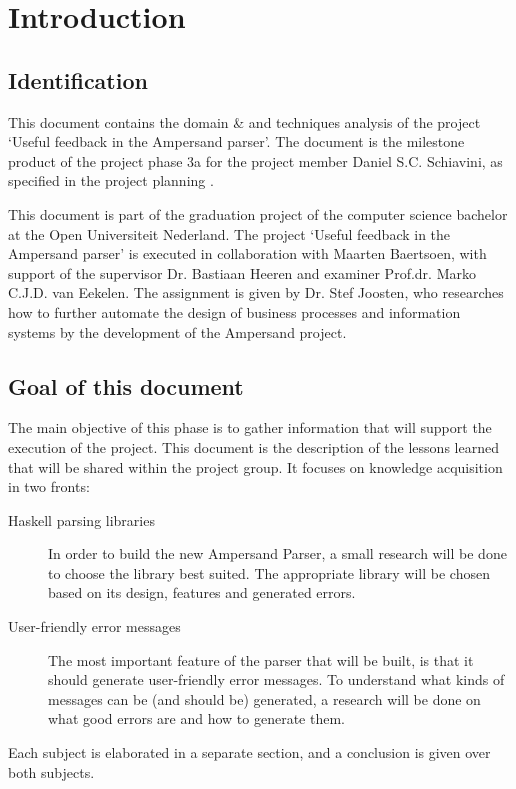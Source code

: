 \section{Introduction}
\subsection{Identification}
This document contains the domain \& and techniques analysis of the project `Useful feedback in the Ampersand parser'.
The document is the milestone product of the project phase 3a for the project member Daniel S.C. Schiavini, as specified in the project planning \cite{plan}.

This document is part of the graduation project of the computer science bachelor at the Open Universiteit Nederland.
The project `Useful feedback in the Ampersand parser' is executed in collaboration with Maarten Baertsoen, with support of the supervisor Dr. Bastiaan Heeren and examiner Prof.dr. Marko C.J.D. van Eekelen.
The assignment is given by Dr. Stef Joosten, who researches how to further automate the design of business processes and information systems by the development of the Ampersand project.

\subsection{Goal of this document}
The main objective of this phase is to gather information that will support the execution of the project.
This document is the description of the lessons learned that will be shared within the project group.
It focuses on knowledge acquisition in two fronts:
\begin{description}
	\item[Haskell parsing libraries]
	In order to build the new Ampersand Parser, a small research will be done to choose the library best suited.
	The appropriate library will be chosen based on its design, features and generated errors.
	
	\item[User-friendly error messages]
	The most important feature of the parser that will be built, is that it should generate user-friendly error messages.
	To understand what kinds of messages can be (and should be) generated, a research will be done on what good errors are and how to generate them.
\end{description}
%
Each subject is elaborated in a separate section, and a conclusion is given over both subjects.

